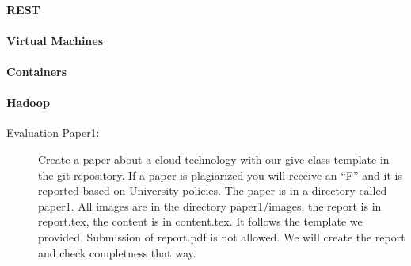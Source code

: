 \begin{comment}
\paragraph{Not yet released Lectures, they will be updated}

\WHERE{\NO}{S:o-workflow}{Week 1}
\WHERE{\NO}{S:o-application}{Week 2}
\WHERE{\NO}{S:o-programming}{Week 3}
\WHERE{\NO}{S:o-streams}{Week 4}
\WHERE{\NO}{S:o-prg-model}{Week 5}
\WHERE{\NO}{S:o-process-communication}{Week 5}
\WHERE{\NO}{S:o-db-memory}{Week 6}
\WHERE{\NO}{S:o-db-object}{Week 6}
\WHERE{\NO}{S:o-Tools}{Week 7}
\WHERE{\NO}{S:o-sql}{Week 6}
\WHERE{\NO}{S:o-NoSQL}{Week 6}
\WHERE{\NO}{S:o-file-management}{Week 8}
\WHERE{\NO}{S:o-data-transport}{Week 8}
\WHERE{\NO}{S:o-cluster}{Week 9}
\WHERE{\NO}{S:o-file-systems}{Week 8}
\WHERE{\NO}{S:o-interoperability}{Week 3}
\WHERE{\NO}{S:o-DevOps}{Week 10}
\WHERE{\NO}{S:o-hypervisors}{Week 11}
\WHERE{\NO}{S:o-cross-cutting-functions}{Week 12}
\WHERE{\NO}{S:o-protocols}{Week 13}
\WHERE{\NO}{S:o-todo}{Week 4}
\end{comment}

\paragraph{REST}

\paragraph{Virtual Machines}

\paragraph{Containers}

\paragraph{Hadoop}




\begin{description}
\item[Evaluation Paper1:] Create a paper about a cloud technology with
  our give class template in the git repository. If a paper is
  plagiarized you will receive an ``F'' and it is reported based on
  University policies. The paper is in a directory called paper1. All
  images are in the directory paper1/images, the report is in
  report.tex, the content is in content.tex. It follows the template
  we provided. Submission of report.pdf is not allowed. We will create
  the report and check completness that way.
\end{description}

